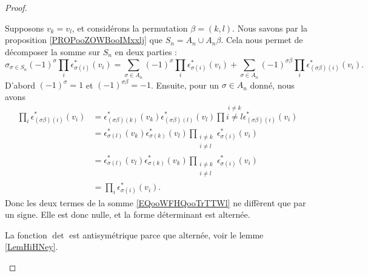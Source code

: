 \begin{proof}
\begin{subproof}
		Supposons \( v_k=v_l\), et considérons la permutation \( \beta=(k,l)\). Nous savons par la proposition \ref{PROPooZOWBooIMxxlj} que \( S_n=A_n\cup A_n\beta\). Cela nous permet de décomposer la somme sur \( S_n\) en deux parties :
		\begin{equation}        \label{EQooWFHQooTrTTWl}
			\sigma_{\sigma\in S_n}(-1)^{\sigma}\prod_i\epsilon_{\sigma(i)}^*(v_i)=\sum_{\sigma\in A_n}(-1)^{\sigma}\prod_i\epsilon_{\sigma(i)}^*(v_i)+\sum_{\sigma\in A_n}(-1)^{\sigma\beta}\prod_i\epsilon_{(\sigma\beta)(i)}^*(v_i).
		\end{equation}
		D'abord \( (-1)^{\sigma}=1\) et \( (-1)^{\sigma\beta}=-1\). Ensuite, pour un \( \sigma\in A_n\) donné, nous avons
		\begin{subequations}
			\begin{align}
				\prod_i\epsilon^*_{(\sigma\beta)(i)}(v_i) & =\epsilon_{(\sigma\beta)(k)}^*(v_k)\epsilon^*_{(\sigma\beta)(l)}(v_l)\prod\stackrel{i\neq k}{i\neq l}\epsilon_{(\sigma\beta)(i)}^*(v_i) \\
				                                          & =\epsilon^*_{\sigma(l)}(v_k)\epsilon^*_{\sigma(k)}(v_l)\prod_{\substack{i\neq k                                                         \\i\neq l}}\epsilon^*_{\sigma(i)}(v_i)\\
				                                          & =\epsilon^*_{\sigma(l)}(v_l)\epsilon^*_{\sigma(k)}(v_k)\prod_{\substack{i\neq k                                                         \\i\neq l}}\epsilon^*_{\sigma(i)}(v_i)\\
				                                          & =\prod_i\epsilon^*_{\sigma(i)}(v_i).
			\end{align}
		\end{subequations}
		Donc les deux termes de la somme \eqref{EQooWFHQooTrTTWl} ne diffèrent que par un signe. Elle est donc nulle, et la forme déterminant est alternée.

		La fonction \( \det\) est antisymétrique parce que alternée, voir le lemme \ref{LemHiHNey}.


\end{subproof}
\end{proof}
